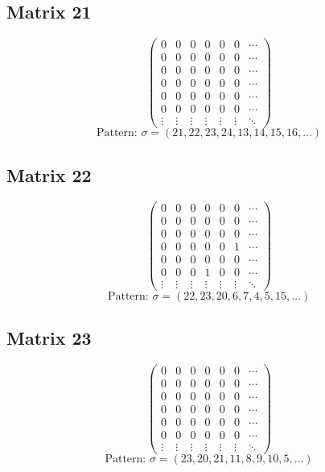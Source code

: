 \documentclass{article}
\begin{document}
\subsection*{Matrix 21}
\[
\begin{pmatrix}
  0 & 0 & 0 & 0 & 0 & 0 & \cdots \\
  0 & 0 & 0 & 0 & 0 & 0 & \cdots \\
  0 & 0 & 0 & 0 & 0 & 0 & \cdots \\
  0 & 0 & 0 & 0 & 0 & 0 & \cdots \\
  0 & 0 & 0 & 0 & 0 & 0 & \cdots \\
  0 & 0 & 0 & 0 & 0 & 0 & \cdots \\
\vdots & \vdots & \vdots & \vdots & \vdots & \vdots & \ddots
\end{pmatrix}
\]
\[
\text{Pattern: } \sigma = (21, 22, 23, 24, 13, 14, 15, 16, \ldots)
\]
\vspace{0.5em}

\subsection*{Matrix 22}
\[
\begin{pmatrix}
  0 & 0 & 0 & 0 & 0 & 0 & \cdots \\
  0 & 0 & 0 & 0 & 0 & 0 & \cdots \\
  0 & 0 & 0 & 0 & 0 & 0 & \cdots \\
  0 & 0 & 0 & 0 & 0 & 1 & \cdots \\
  0 & 0 & 0 & 0 & 0 & 0 & \cdots \\
  0 & 0 & 0 & 1 & 0 & 0 & \cdots \\
\vdots & \vdots & \vdots & \vdots & \vdots & \vdots & \ddots
\end{pmatrix}
\]
\[
\text{Pattern: } \sigma = (22, 23, 20, 6, 7, 4, 5, 15, \ldots)
\]
\vspace{0.5em}

\subsection*{Matrix 23}
\[
\begin{pmatrix}
  0 & 0 & 0 & 0 & 0 & 0 & \cdots \\
  0 & 0 & 0 & 0 & 0 & 0 & \cdots \\
  0 & 0 & 0 & 0 & 0 & 0 & \cdots \\
  0 & 0 & 0 & 0 & 0 & 0 & \cdots \\
  0 & 0 & 0 & 0 & 0 & 0 & \cdots \\
  0 & 0 & 0 & 0 & 0 & 0 & \cdots \\
\vdots & \vdots & \vdots & \vdots & \vdots & \vdots & \ddots
\end{pmatrix}
\]
\[
\text{Pattern: } \sigma = (23, 20, 21, 11, 8, 9, 10, 5, \ldots)
\]
\vspace{0.5em}
\end{document}
